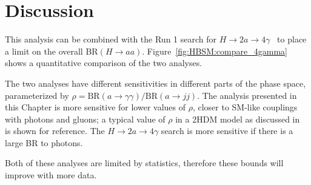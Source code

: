 \FloatBarrier
\section{Discussion}
This analysis can be combined with the Run 1 search for $H\to 2a \to 4\gamma$~\cite{Aad:2015bua}
to place a limit on the overall BR$(H\rightarrow aa)$. 
Figure~\ref{fig:HBSM:compare_4gamma} shows a quantitative comparison of the two analyses.

The two analyses have different sensitivities in different parts of the phase space, 
parameterized by $\rho=\text{BR}(a\rightarrow \gamma\gamma)/\text{BR}(a\rightarrow jj)$. 
The analysis presented in this Chapter is more sensitive for lower values of $\rho$, 
closer to SM-like couplings with photons and gluons; a typical value of $\rho$ in a 2HDM model as discussed in~\cite{Curtin:2013fra} is shown for reference.
The $H\to 2a \to 4\gamma$ search is more sensitive if there is a large BR to photons.
 
Both of these analyses are limited by statistics, 
therefore these bounds will improve with more data. 

